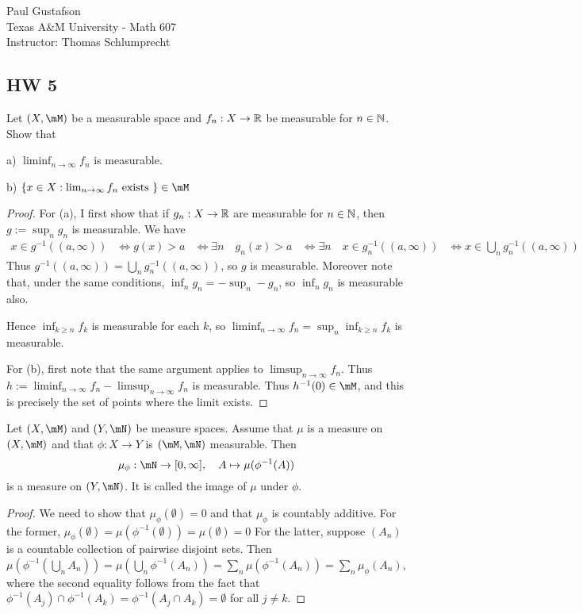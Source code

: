 \documentclass{article}
\begin{document}
\noindent Paul Gustafson\\
\noindent Texas A\&M University - Math 607\\ 
\noindent Instructor: Thomas Schlumprecht

\subsection*{HW 5}
 Let $(X, \mM)$ be a measurable space and $f_n : X \to \mathbb{R}$ be measurable for $n \in \mathbb{N}$. Show that 

a) $\liminf_{n \to \infty} f_n$ is measurable.

b) $\{x \in X : \lim_{n \to \infty} f_n \text{ exists } \} \in \mM$

\begin{proof}
For (a), I first show that if $g_n : X \to \mathbb{R}$ are measurable for $n \in \mathbb{N}$, then $g := \sup_n g_n$ is measurable.  
We have
\begin{align*}
x \in g^{-1}((a, \infty)) & \iff g(x) > a
& \iff \exists n \quad g_n(x) > a
& \iff \exists n \quad x \in g_n^{-1}((a,\infty))
& \iff x \in \bigcup_n g_n^{-1}((a, \infty))
\end{align*}
Thus $g^{-1}((a, \infty)) = \bigcup_n g_n^{-1}((a, \infty))$, so $g$ is measurable.  Moreover note that, under the same conditions, $\inf_n g_n = - \sup_n -g_n$, so $\inf_n g_n$ is measurable also.

Hence $\inf_{k \ge n} f_k$ is measurable for each $k$, so $\liminf_{n\to \infty} f_n = \sup_n \inf_{k \ge n} f_k$ is measurable.

For (b), first note that the same argument applies to $\limsup_{n \to \infty} f_n$.  Thus $h := \liminf_{n \to \infty} f_n - \limsup_{n \to \infty} f_n$ is measurable.  Thus $h^{-1}(0) \in \mM$, and this is precisely the set of points where the limit exists.
\end{proof}

 Let $(X, \mM)$ and $(Y, \mN)$ be measure spaces. Assume that $\mu$ is a measure on $(X, \mM)$ and that $\phi: X \to Y$ is $(\mM, \mN)$ measurable. Then 
$$ \mu_\phi : \mN \to [0, \infty], \quad A \mapsto \mu(\phi^{-1}(A))$$
is a measure on $(Y, \mN)$. It is called the image of $\mu$ under $\phi$.
\begin{proof}
We need to show that $\mu_\phi(\emptyset) = 0$ and that $\mu_\phi$ is countably additive. For the former, $\mu_\phi(\emptyset) = \mu(\phi^{-1}(\emptyset)) = \mu(\emptyset) = 0$  For the latter, suppose $(A_n)$ is a countable collection of pairwise disjoint sets.  Then $\mu(\phi^{-1}(\bigcup_n A_n)) = \mu(\bigcup_n \phi^{-1} (A_n)) = \sum_n \mu(\phi^{-1}(A_n)) = \sum_n \mu_\phi(A_n)$, where the second equality follows from the fact that $\phi^{-1}(A_j) \cap \phi^{-1}(A_k) = \phi^{-1}(A_j \cap A_k) = \emptyset$ for all $j \neq k$.
\end{proof}
\end{document}
